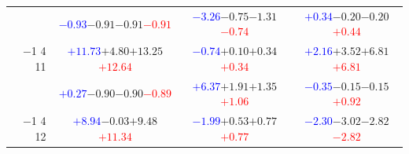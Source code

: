 \documentclass[compress]{beamer}
\begin{document}
\begin{frame}
\begin{tabular}{r | c | c | c}
          & \textcolor{blue}{$-0.93$}\hspace{0.1 cm}$-0.91$\hspace{0.1 cm}$-0.91$\hspace{0.1 cm}\textcolor{red}{$-0.91$} & \textcolor{blue}{$-3.26$}\hspace{0.1 cm}$-0.75$\hspace{0.1 cm}$-1.31$\hspace{0.1 cm}\textcolor{red}{$-0.74$} & \textcolor{blue}{$+0.34$}\hspace{0.1 cm}$-0.20$\hspace{0.1 cm}$-0.20$\hspace{0.1 cm}\textcolor{red}{$+0.44$} \\
$-$1 4 11 & \textcolor{blue}{$+11.73$}\hspace{0.1 cm}$+4.80$\hspace{0.1 cm}$+13.25$\hspace{0.1 cm}\textcolor{red}{$+12.64$} & \textcolor{blue}{$-0.74$}\hspace{0.1 cm}$+0.10$\hspace{0.1 cm}$+0.34$\hspace{0.1 cm}\textcolor{red}{$+0.34$} & \textcolor{blue}{$+2.16$}\hspace{0.1 cm}$+3.52$\hspace{0.1 cm}$+6.81$\hspace{0.1 cm}\textcolor{red}{$+6.81$} \\
          & \textcolor{blue}{$+0.27$}\hspace{0.1 cm}$-0.90$\hspace{0.1 cm}$-0.90$\hspace{0.1 cm}\textcolor{red}{$-0.89$} & \textcolor{blue}{$+6.37$}\hspace{0.1 cm}$+1.91$\hspace{0.1 cm}$+1.35$\hspace{0.1 cm}\textcolor{red}{$+1.06$} & \textcolor{blue}{$-0.35$}\hspace{0.1 cm}$-0.15$\hspace{0.1 cm}$-0.15$\hspace{0.1 cm}\textcolor{red}{$+0.92$} \\
$-$1 4 12 & \textcolor{blue}{$+8.94$}\hspace{0.1 cm}$-0.03$\hspace{0.1 cm}$+9.48$\hspace{0.1 cm}\textcolor{red}{$+11.34$} & \textcolor{blue}{$-1.99$}\hspace{0.1 cm}$+0.53$\hspace{0.1 cm}$+0.77$\hspace{0.1 cm}\textcolor{red}{$+0.77$} & \textcolor{blue}{$-2.30$}\hspace{0.1 cm}$-3.02$\hspace{0.1 cm}$-2.82$\hspace{0.1 cm}\textcolor{red}{$-2.82$} \\

\end{tabular}
\end{frame}
\end{document}
